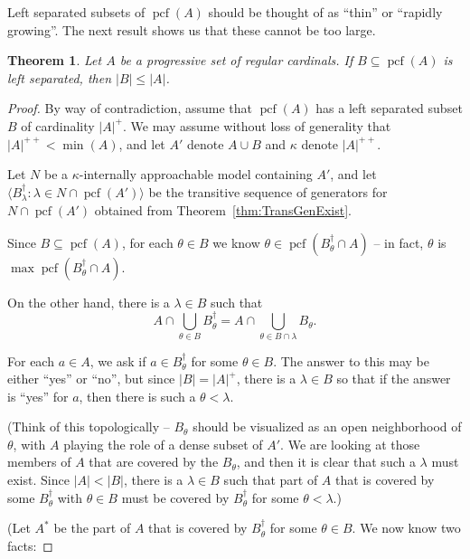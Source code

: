 \documentclass[10pt]{amsart}
\theoremstyle{plain}
\newtheorem{theorem}{Theorem}
\theoremstyle{definition}
\theoremstyle{remark}
\DeclareMathOperator{\pcf}{pcf}
\numberwithin{equation}{section}
\begin{document}
Left separated subsets of $\pcf(A)$ should be thought of as ``thin'' or ``rapidly growing''. The next result shows us that these
cannot be too large.

\begin{theorem}
Let $A$ be a progressive set of regular cardinals.  If $B\subseteq\pcf(A)$ is left separated, then $|B|\leq |A|$.
\end{theorem}
\begin{proof}
By way of contradiction, assume that $\pcf(A)$ has a left separated subset $B$ of cardinality $|A|^+$.  We may assume without loss
of generality that $|A|^{++}<\min(A)$, and let $A'$ denote $A\cup B$ and $\kappa$ denote $|A|^{++}$.

Let $N$ be a $\kappa$-internally approachable model containing $A'$, and let $\langle B^\dagger_\lambda:\lambda\in N\cap\pcf(A')\rangle$
be the transitive sequence of generators for $N\cap\pcf(A')$ obtained from Theorem~\ref{thm:TransGenExist}.



Since $B\subseteq\pcf(A)$, for each $\theta\in B$ we know $\theta\in\pcf(B_\theta^\dagger\cap A)$ -- in fact, $\theta$ is
$\max\pcf(B^\dagger_\theta\cap A)$.

On the other hand, there is a $\lambda\in B$ such that
\begin{equation}
A\cap\bigcup_{\theta\in B}B_\theta^\dagger = A\cap\bigcup_{\theta\in B\cap\lambda}B_\theta.
\end{equation}


For each $a\in A$, we ask if $a\in B^\dagger_\theta$ for some $\theta\in B$. The answer to this may be either ``yes'' or ``no'', but
since $|B|=|A|^+$, there is a $\lambda\in B$ so that if the answer is ``yes'' for $a$, then there is such a $\theta<\lambda$.

(Think of this topologically -- $B_\theta$ should be visualized as an open neighborhood of $\theta$, with $A$ playing the role of a
dense subset of $A'$.   We are looking at those members of $A$ that are covered by the $B_\theta$, and then it is clear that such a $\lambda$
must exist.  Since $|A|<|B|$, there is a $\lambda\in B$ such that part of $A$ that is covered by some $B^\dagger_\theta$ with $\theta\in B$ must be covered
by $B_\theta^\dagger$ for some $\theta<\lambda$.)

\bigskip

(Let $A^*$ be the part of $A$ that is covered by $B_\theta^\dagger$ for some $\theta\in B$.   We now know two facts:



\end{proof}
\end{document}
